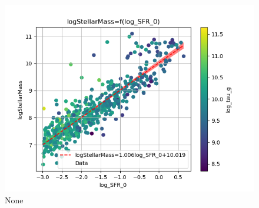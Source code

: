 \documentclass[a4paper,twocolumn]{article}
\begin{document}
\begin{figure}[!htpb]
\centering
\includegraphics[width=.9\linewidth]{./figs/log_SFR_0-logStellarMass-color_log_tau_g.png}
\caption{\label{fig:None}None}
\end{figure}
\end{document}
